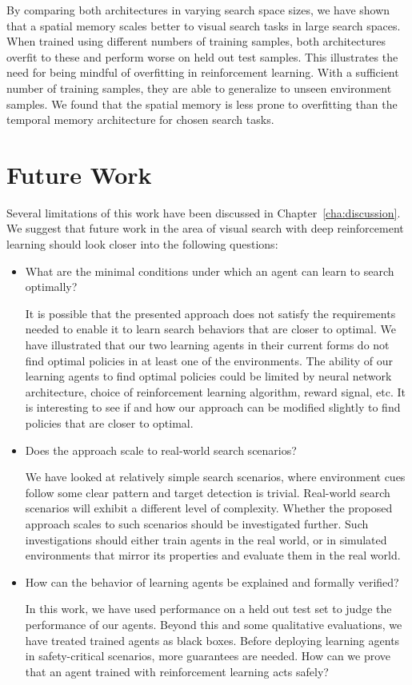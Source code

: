 By comparing both architectures in varying search space sizes, we have shown that a spatial memory scales better to visual search tasks in large search spaces.
When trained using different numbers of training samples, both architectures overfit to these and perform worse on held out test samples.
This illustrates the need for being mindful of overfitting in reinforcement learning.
With a sufficient number of training samples, they are able to generalize to unseen environment samples.
We found that the spatial memory is less prone to overfitting than the temporal memory architecture for chosen search tasks.

\section{Future Work}

Several limitations of this work have been discussed in Chapter~\ref{cha:discussion}.
We suggest that future work in the area of visual search with deep reinforcement learning should look closer into the following questions:

\begin{itemize}
    \item What are the minimal conditions under which an agent can learn to search optimally?
    
    It is possible that the presented approach does not satisfy the requirements needed to enable it to learn search behaviors that are closer to optimal.
    We have illustrated that our two learning agents in their current forms do not find optimal policies in at least one of the environments.
    The ability of our learning agents to find optimal policies could be limited by neural network architecture, choice of reinforcement learning algorithm, reward signal, etc.
    It is interesting to see if and how our approach can be modified slightly to find policies that are closer to optimal.

    \item Does the approach scale to real-world search scenarios?

    We have looked at relatively simple search scenarios, where environment cues follow some clear pattern and target detection is trivial.
    Real-world search scenarios will exhibit a different level of complexity.
    Whether the proposed approach scales to such scenarios should be investigated further.
    Such investigations should either train agents in the real world, or in simulated environments that mirror its properties and evaluate them in the real world.

    \item How can the behavior of learning agents be explained and formally verified?
    
    In this work, we have used performance on a held out test set to judge the performance of our agents.
    Beyond this and some qualitative evaluations, we have treated trained agents as black boxes. 
    Before deploying learning agents in safety-critical scenarios, more guarantees are needed.
    How can we prove that an agent trained with reinforcement learning acts safely?
\end{itemize}


